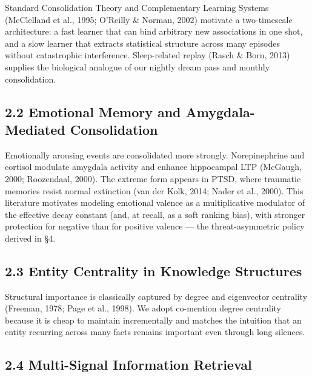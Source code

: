 \documentclass[]{article}
\begin{document}
Standard Consolidation Theory and Complementary Learning Systems
(McClelland et al., 1995; O'Reilly \& Norman, 2002) motivate a two-timescale
architecture: a fast learner that can bind arbitrary new associations in
one shot, and a slow learner that extracts statistical structure across
many episodes without catastrophic interference. Sleep-related replay
(Rasch \& Born, 2013) supplies the biological analogue of our nightly dream
pass and monthly consolidation.

\hypertarget{emotional-memory}{%
\subsection{\texorpdfstring{\textbf{2.2 Emotional Memory and
Amygdala-Mediated
Consolidation}}{2.2 Emotional Memory and Amygdala-Mediated Consolidation}}\label{emotional-memory}}

Emotionally arousing events are consolidated more strongly. Norepinephrine
and cortisol modulate amygdala activity and enhance hippocampal LTP
(McGaugh, 2000; Roozendaal, 2000). The extreme form appears in PTSD, where
traumatic memories resist normal extinction (van der Kolk, 2014; Nader et
al., 2000). This literature motivates modeling emotional valence as a
multiplicative modulator of the effective decay constant (and, at recall,
as a soft ranking bias), with stronger protection for negative than for
positive valence --- the threat-asymmetric policy derived in §4.

\hypertarget{entity-centrality}{%
\subsection{\texorpdfstring{\textbf{2.3 Entity Centrality in Knowledge
Structures}}{2.3 Entity Centrality in Knowledge Structures}}\label{entity-centrality}}

Structural importance is classically captured by degree and eigenvector
centrality (Freeman, 1978; Page et al., 1998). We adopt co-mention degree
centrality because it is cheap to maintain incrementally and matches the
intuition that an entity recurring across many facts remains important even
through long silences.

\hypertarget{multi-signal-ir}{%
\subsection{\texorpdfstring{\textbf{2.4 Multi-Signal Information
Retrieval}}{2.4 Multi-Signal Information Retrieval}}\label{multi-signal-ir}}
\end{document}
